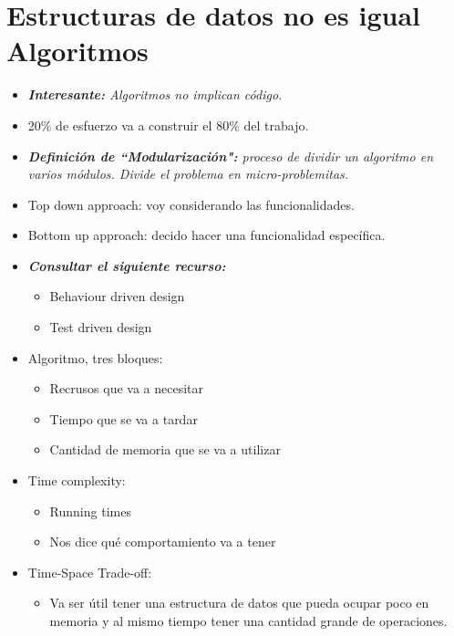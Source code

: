 \section{Estructuras de datos no es igual Algoritmos}
\begin{itemize}
    \item \emph{\textbf{Interesante:} Algoritmos no implican código. }
    \item 20\% de esfuerzo va a construir el 80\% del trabajo.
    \item \emph{\textbf{Definición de ``Modularización":} proceso de dividir un algoritmo en varios módulos. Divide el problema en micro-problemitas.}
    \item Top down approach: voy considerando las funcionalidades.
    \item Bottom up approach: decido hacer una funcionalidad específica.
    \item \emph{\textbf{Consultar el siguiente recurso:}} 
        \begin{itemize}
            \item Behaviour driven design 
            \item Test driven design
        \end{itemize}
    
    \item Algoritmo, tres bloques:
        \begin{itemize}
            \item Recrusos que va a necesitar 
            \item Tiempo que se va a tardar 
            \item Cantidad de memoria que se va a utilizar
        \end{itemize}
    
    \item Time complexity:
        \begin{itemize}
            \item Running times 
            \item Nos dice qué comportamiento va a tener 
        \end{itemize}
    
    \item Time-Space Trade-off:
        \begin{itemize}
            \item Va ser útil tener una estructura de datos que pueda ocupar poco en memoria y al mismo tiempo tener una cantidad grande de operaciones.
        \end{itemize}
    

\end{itemize}
